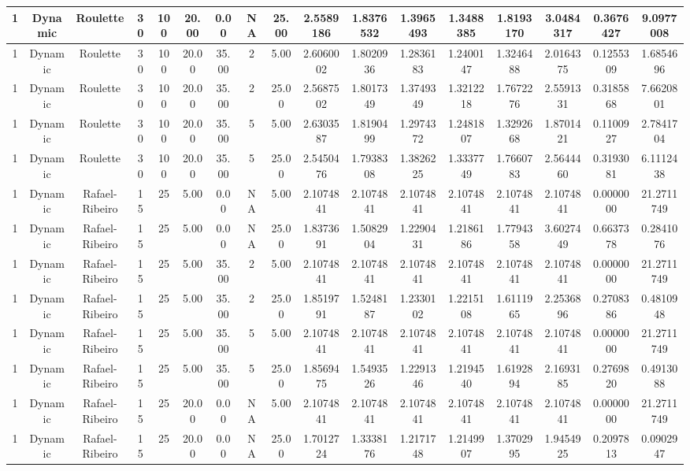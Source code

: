 \documentclass[a4paper]{article}
\begin{document}
\begin{center}
\begin{tabular}{ | c | c | c | c | c | c | c | c | c | c | c | c | c | c | c | c | c | }
		\hline
		1	&	Dynamic	&	Roulette	&	30	&	100	&	20.00	&	0.00	&	NA	&	25.00	&	2.5589186	&	1.8376532	&	1.3965493	&	1.3488385	&	1.8193170	&	3.0484317	&	0.3676427	&	9.0977008 \\
		\hline
		1	&	Dynamic	&	Roulette	&	30	&	100	&	20.00	&	35.00	&	2	&	5.00	&	2.6060002	&	1.8020936	&	1.2836183	&	1.2400147	&	1.3246488	&	2.0164375	&	0.1255309	&	1.6854696 \\
		\hline
		1	&	Dynamic	&	Roulette	&	30	&	100	&	20.00	&	35.00	&	2	&	25.00	&	2.5687502	&	1.8017349	&	1.3749349	&	1.3212218	&	1.7672276	&	2.5591331	&	0.3185868	&	7.6620801 \\
		\hline
		1	&	Dynamic	&	Roulette	&	30	&	100	&	20.00	&	35.00	&	5	&	5.00	&	2.6303587	&	1.8190499	&	1.2974372	&	1.2481807	&	1.3292668	&	1.8701421	&	0.1100927	&	2.7841704 \\
		\hline
		1	&	Dynamic	&	Roulette	&	30	&	100	&	20.00	&	35.00	&	5	&	25.00	&	2.5450476	&	1.7938308	&	1.3826225	&	1.3337749	&	1.7660783	&	2.5644460	&	0.3193081	&	6.1112438 \\
		\hline
		1	&	Dynamic	&	Rafael-Ribeiro	&	15	&	25	&	5.00	&	0.00	&	NA	&	5.00	&	2.1074841	&	2.1074841	&	2.1074841	&	2.1074841	&	2.1074841	&	2.1074841	&	0.0000000	&	21.2711749 \\
		\hline
		1	&	Dynamic	&	Rafael-Ribeiro	&	15	&	25	&	5.00	&	0.00	&	NA	&	25.00	&	1.8373691	&	1.5082904	&	1.2290431	&	1.2186186	&	1.7794358	&	3.6027449	&	0.6637378	&	0.2841076 \\
		\hline
		1	&	Dynamic	&	Rafael-Ribeiro	&	15	&	25	&	5.00	&	35.00	&	2	&	5.00	&	2.1074841	&	2.1074841	&	2.1074841	&	2.1074841	&	2.1074841	&	2.1074841	&	0.0000000	&	21.2711749 \\
		\hline
		1	&	Dynamic	&	Rafael-Ribeiro	&	15	&	25	&	5.00	&	35.00	&	2	&	25.00	&	1.8519791	&	1.5248187	&	1.2330102	&	1.2215108	&	1.6111965	&	2.2536896	&	0.2708386	&	0.4810948 \\
		\hline
		1	&	Dynamic	&	Rafael-Ribeiro	&	15	&	25	&	5.00	&	35.00	&	5	&	5.00	&	2.1074841	&	2.1074841	&	2.1074841	&	2.1074841	&	2.1074841	&	2.1074841	&	0.0000000	&	21.2711749 \\
		\hline
		1	&	Dynamic	&	Rafael-Ribeiro	&	15	&	25	&	5.00	&	35.00	&	5	&	25.00	&	1.8569475	&	1.5493526	&	1.2291346	&	1.2194540	&	1.6192894	&	2.1693185	&	0.2769820	&	0.4913088 \\
		\hline
		1	&	Dynamic	&	Rafael-Ribeiro	&	15	&	25	&	20.00	&	0.00	&	NA	&	5.00	&	2.1074841	&	2.1074841	&	2.1074841	&	2.1074841	&	2.1074841	&	2.1074841	&	0.0000000	&	21.2711749 \\
		\hline
		1	&	Dynamic	&	Rafael-Ribeiro	&	15	&	25	&	20.00	&	0.00	&	NA	&	25.00	&	1.7012724	&	1.3338176	&	1.2171748	&	1.2149907	&	1.3702995	&	1.9454925	&	0.2097813	&	0.0902947 \\

\end{tabular}
\end{center}
\end{document}
